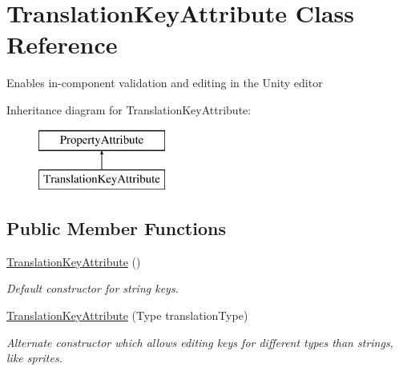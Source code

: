 \hypertarget{class_translation_key_attribute}{}\section{Translation\+Key\+Attribute Class Reference}
\label{class_translation_key_attribute}


Enables in-\/component validation and editing in the Unity editor  


Inheritance diagram for Translation\+Key\+Attribute\+:\begin{figure}[H]
\begin{center}
\leavevmode
\includegraphics[height=2.000000cm]{class_translation_key_attribute}
\end{center}
\end{figure}
\subsection*{Public Member Functions}
\begin{DoxyCompactItemize}
\item 
\hyperlink{class_translation_key_attribute_aaaa39a1b2bdb74dffe5e0f70a2aa4b65}{Translation\+Key\+Attribute} ()
\begin{DoxyCompactList}\small\item\em Default constructor for string keys. \end{DoxyCompactList}\item 
\hyperlink{class_translation_key_attribute_a6ebf0fced227dc7e51c581f9781e3ec2}{Translation\+Key\+Attribute} (Type translation\+Type)
\begin{DoxyCompactList}\small\item\em Alternate constructor which allows editing keys for different types than strings, like sprites. \end{DoxyCompactList}\end{DoxyCompactItemize}
